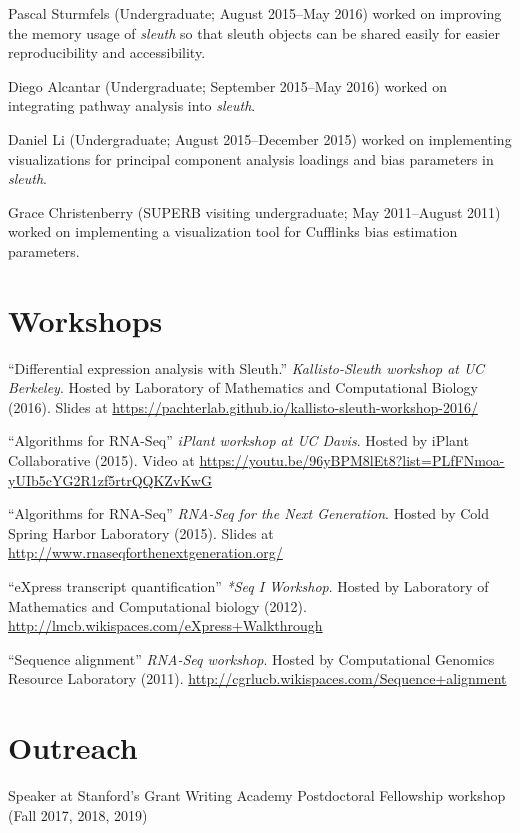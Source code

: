 \documentclass[11pt,notitlepage]{article} %
\begin{document}
\medskip

Pascal Sturmfels (Undergraduate; August 2015--May 2016) worked on improving the memory usage of \emph{sleuth} so that sleuth objects can be shared easily for easier reproducibility and accessibility.

\medskip

Diego Alcantar (Undergraduate; September 2015--May 2016) worked on integrating pathway analysis into \emph{sleuth}.

\medskip

Daniel Li (Undergraduate; August 2015--December 2015) worked on implementing visualizations for principal component analysis loadings and bias parameters in \emph{sleuth}.

\medskip

Grace Christenberry (SUPERB visiting undergraduate; May 2011--August 2011) worked on implementing a visualization tool for Cufflinks bias estimation parameters.

\bigskip
\section*{Workshops}
\medskip
 ``Differential expression analysis with Sleuth.'' {\emph{Kallisto-Sleuth workshop at UC Berkeley}}. Hosted by Laboratory of Mathematics and Computational Biology (2016). Slides at \url{https://pachterlab.github.io/kallisto-sleuth-workshop-2016/}

\medskip

``Algorithms for RNA-Seq'' {\emph{iPlant workshop at UC Davis}}. Hosted by iPlant Collaborative (2015). Video at \url{https://youtu.be/96yBPM8lEt8?list=PLfFNmoa-yUIb5cYG2R1zf5rtrQQKZvKwG}

\medskip

``Algorithms for RNA-Seq'' {\emph{RNA-Seq for the Next Generation}}. Hosted by Cold Spring Harbor Laboratory (2015). Slides at \url{http://www.rnaseqforthenextgeneration.org/}

\medskip

``eXpress transcript quantification'' {\emph{*Seq I Workshop}}. Hosted by Laboratory of Mathematics and Computational biology (2012). \url{http://lmcb.wikispaces.com/eXpress+Walkthrough}

\medskip

``Sequence alignment'' {\emph{RNA-Seq workshop}}. Hosted by Computational Genomics Resource Laboratory (2011).  \url{http://cgrlucb.wikispaces.com/Sequence+alignment}

\bigskip
\section*{Outreach}
\medskip
Speaker at Stanford's Grant Writing Academy Postdoctoral Fellowship workshop (Fall 2017, 2018, 2019)
\end{document}
